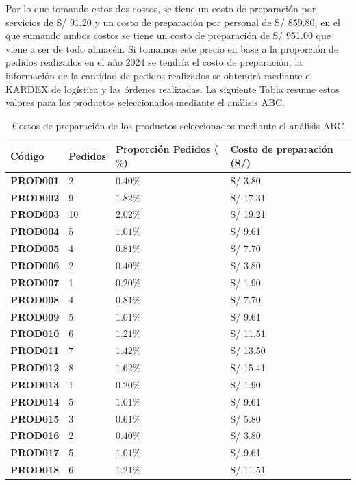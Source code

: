 Por lo que tomando estos dos costos, se tiene un costo de preparación por servicios de S/ 91.20 y un costo de preparación por personal de S/ 859.80, en el que sumando ambos costos se tiene un costo de preparación de S/ 951.00 que viene a ser de todo almacén. Si tomamos este precio en base a la proporción de pedidos realizados en el año 2024 se tendría el costo de preparación, la información de la cantidad de pedidos realizados se obtendrá mediante el KARDEX de logística y las órdenes realizadas. La siguiente Tabla resume estos valores para los productos seleccionados mediante el análisis ABC.

\begin{table}[H]
    \caption{Costos de preparación de los productos seleccionados mediante el análisis ABC}
    \begin{tabular}{p{2cm} p{1.5cm} p{5.5cm} p{5cm}} %
        \hline
        \textbf{Código} & \textbf{Pedidos} & \textbf{Proporción Pedidos ($\%$)} & \textbf{Costo de preparación (S/)} \\
        \hline
        \textbf{PROD001} & 2 & $0.40\%$ & S/ 3.80 \\
        \textbf{PROD002} & 9 & $1.82\%$ & S/ 17.31 \\
        \textbf{PROD003} & 10 & $2.02\%$ & S/ 19.21 \\
        \textbf{PROD004} & 5 & $1.01\%$ & S/ 9.61 \\
        \textbf{PROD005} & 4 & $0.81\%$ & S/ 7.70 \\
        \textbf{PROD006} & 2 & $0.40\%$ & S/ 3.80 \\
        \textbf{PROD007} & 1 & $0.20\%$ & S/ 1.90 \\
        \textbf{PROD008} & 4 & $0.81\%$ & S/ 7.70 \\
        \textbf{PROD009} & 5 & $1.01\%$ & S/ 9.61 \\
        \textbf{PROD010} & 6 & $1.21\%$ & S/ 11.51 \\
        \textbf{PROD011} & 7 & $1.42\%$ & S/ 13.50 \\
        \textbf{PROD012} & 8 & $1.62\%$ & S/ 15.41 \\
        \textbf{PROD013} & 1 & $0.20\%$ & S/ 1.90 \\
        \textbf{PROD014} & 5 & $1.01\%$ & S/ 9.61 \\
        \textbf{PROD015} & 3 & $0.61\%$ & S/ 5.80 \\
        \textbf{PROD016} & 2 & $0.40\%$ & S/ 3.80 \\
        \textbf{PROD017} & 5 & $1.01\%$ & S/ 9.61 \\
        \textbf{PROD018} & 6 & $1.21\%$ & S/ 11.51 \\
        \hline
    \end{tabular}
    \label{table:GrupoA_Costo_Preparacion}
\end{table}


